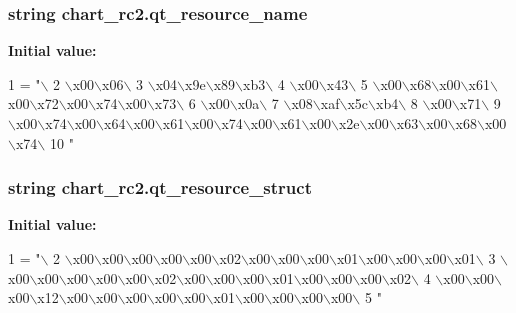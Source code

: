 \subsubsection[{qt\+\_\+resource\+\_\+name}]{\setlength{\rightskip}{0pt plus 5cm}string chart\+\_\+rc2.\+qt\+\_\+resource\+\_\+name}\label{namespacechart__rc2_ae49c6c413c1c35802bbd8edfeffc699a}
{\bfseries Initial value\+:}
\begin{DoxyCode}
1 = \textcolor{stringliteral}{"\(\backslash\)}
2 \textcolor{stringliteral}{\(\backslash\)x00\(\backslash\)x06\(\backslash\)}
3 \textcolor{stringliteral}{\(\backslash\)x04\(\backslash\)x9e\(\backslash\)x89\(\backslash\)xb3\(\backslash\)}
4 \textcolor{stringliteral}{\(\backslash\)x00\(\backslash\)x43\(\backslash\)}
5 \textcolor{stringliteral}{\(\backslash\)x00\(\backslash\)x68\(\backslash\)x00\(\backslash\)x61\(\backslash\)x00\(\backslash\)x72\(\backslash\)x00\(\backslash\)x74\(\backslash\)x00\(\backslash\)x73\(\backslash\)}
6 \textcolor{stringliteral}{\(\backslash\)x00\(\backslash\)x0a\(\backslash\)}
7 \textcolor{stringliteral}{\(\backslash\)x08\(\backslash\)xaf\(\backslash\)x5c\(\backslash\)xb4\(\backslash\)}
8 \textcolor{stringliteral}{\(\backslash\)x00\(\backslash\)x71\(\backslash\)}
9 \textcolor{stringliteral}{\(\backslash\)x00\(\backslash\)x74\(\backslash\)x00\(\backslash\)x64\(\backslash\)x00\(\backslash\)x61\(\backslash\)x00\(\backslash\)x74\(\backslash\)x00\(\backslash\)x61\(\backslash\)x00\(\backslash\)x2e\(\backslash\)x00\(\backslash\)x63\(\backslash\)x00\(\backslash\)x68\(\backslash\)x00\(\backslash\)x74\(\backslash\)}
10 \textcolor{stringliteral}{"}
\end{DoxyCode}
\hypertarget{namespacechart__rc2_af046b17efda8cfb0a3229fdaee1ae1d8}{}
\subsubsection[{qt\+\_\+resource\+\_\+struct}]{\setlength{\rightskip}{0pt plus 5cm}string chart\+\_\+rc2.\+qt\+\_\+resource\+\_\+struct}\label{namespacechart__rc2_af046b17efda8cfb0a3229fdaee1ae1d8}
{\bfseries Initial value\+:}
\begin{DoxyCode}
1 = \textcolor{stringliteral}{"\(\backslash\)}
2 \textcolor{stringliteral}{\(\backslash\)x00\(\backslash\)x00\(\backslash\)x00\(\backslash\)x00\(\backslash\)x00\(\backslash\)x02\(\backslash\)x00\(\backslash\)x00\(\backslash\)x00\(\backslash\)x01\(\backslash\)x00\(\backslash\)x00\(\backslash\)x00\(\backslash\)x01\(\backslash\)}
3 \textcolor{stringliteral}{\(\backslash\)x00\(\backslash\)x00\(\backslash\)x00\(\backslash\)x00\(\backslash\)x00\(\backslash\)x02\(\backslash\)x00\(\backslash\)x00\(\backslash\)x00\(\backslash\)x01\(\backslash\)x00\(\backslash\)x00\(\backslash\)x00\(\backslash\)x02\(\backslash\)}
4 \textcolor{stringliteral}{\(\backslash\)x00\(\backslash\)x00\(\backslash\)x00\(\backslash\)x12\(\backslash\)x00\(\backslash\)x00\(\backslash\)x00\(\backslash\)x00\(\backslash\)x00\(\backslash\)x01\(\backslash\)x00\(\backslash\)x00\(\backslash\)x00\(\backslash\)x00\(\backslash\)}
5 \textcolor{stringliteral}{"}
\end{DoxyCode}
